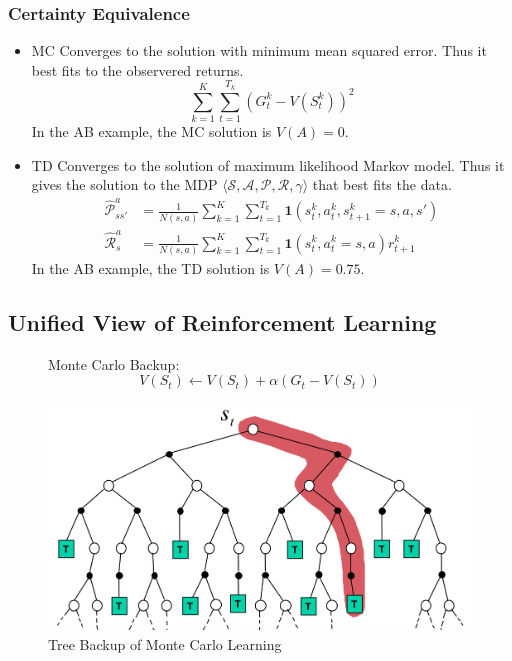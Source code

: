 \subsubsection*{Certainty Equivalence}
\begin{itemize}
    \item MC Converges to the solution with minimum mean squared error. Thus it best fits to 
    the observered returns.
    \[
        \sum_{k=1}^{K}\sum_{t=1}^{T_k}(G_t^k - V(S_t^k))^2 
    \]
    In the AB example, the MC solution is \(V(A) = 0\).
    \item TD Converges to the solution of maximum likelihood Markov model. Thus it gives
    the solution to the MDP \( \langle \mathcal{S}, \mathcal{A}, \mathcal{P},
     \mathcal{R}, \gamma \rangle\)  that best fits the data.
     \[
        \begin{aligned}
            \hat{\mathcal{P}}_{ss'}^a &= \frac{1}{N(s,a)}\sum_{k=1}^{K}\sum_{t=1}^{T_k}
            \bm{1}(s_t^k, a_t^k, s_{t+1}^k = s, a, s') \\
            \hat{\mathcal{R}}_{s}^a &= \frac{1}{N(s,a)}\sum_{k=1}^{K}\sum_{t=1}^{T_k}
            \bm{1}(s_t^k, a_t^k = s, a)r_{t+1}^k
        \end{aligned}
     \]
     In the AB example, the TD solution is \(V(A) = 0.75\).
\end{itemize}

\subsection{Unified View of Reinforcement Learning}
\begin{figure}[H]
    \begin{minipage}{0.5\textwidth}
        Monte Carlo Backup:
      \[
        V(S_t) \leftarrow V(S_t) + \alpha\left( 
            G_t - V(S_t)
         \right)
      \]
    \end{minipage}%
    \begin{minipage}{0.5\textwidth}
      \includegraphics[width=\textwidth]{figures/uni-mc.png}
      \caption{Tree Backup of Monte Carlo Learning}
        \label{fig:uni-mc}
    \end{minipage}
\end{figure}

